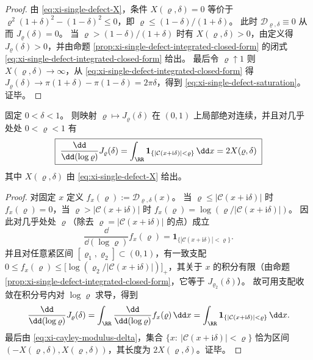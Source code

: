 \begin{proof}
由 \eqref{eq:xi-single-defect-X}，条件 \(X(\varrho,\delta)=0\) 等价于
\(
\varrho^2(1+\delta)^2-(1-\delta)^2\le 0
\)，即 \(\varrho\le (1-\delta)/(1+\delta)\)。
此时 \(\mathcal{D}_{\varrho,\delta}\equiv 0\) 从而 \(J_{\varrho}(\delta)=0\)。
当 \(\varrho>(1-\delta)/(1+\delta)\) 时有 \(X(\varrho,\delta)>0\)，由定义得 \(J_{\varrho}(\delta)>0\)，并由命题 \ref{prop:xi-single-defect-integrated-closed-form} 的闭式 \eqref{eq:xi-single-defect-integrated-closed-form} 给出。
最后令 \(\varrho\uparrow 1\) 则 \(X(\varrho,\delta)\to\infty\)，从 \eqref{eq:xi-single-defect-integrated-closed-form} 得
\(
J_{\varrho}(\delta)\to \pi(1+\delta)-\pi(1-\delta)=2\pi\delta
\)，得到 \eqref{eq:xi-single-defect-saturation}。证毕。
\end{proof}



\begin{proposition}[可见区长度与对数半径导数]\label{prop:xi-single-defect-mass-log-derivative}
固定 \(0<\delta<1\)。
则映射 \(\varrho\mapsto J_{\varrho}(\delta)\) 在 \((0,1)\) 上局部绝对连续，并且对几乎处处 \(0<\varrho<1\) 有
\begin{equation}\label{eq:xi-single-defect-log-derivative}
\boxed{\;
\frac{\dd}{\dd(\log\varrho)}J_{\varrho}(\delta)
=\int_{\RR}\mathbf 1_{\{|\mathcal{C}(x+\mathrm{i}\delta)|<\varrho\}}\,\dd x
=2X(\varrho,\delta)\;}
\end{equation}
其中 \(X(\varrho,\delta)\) 由 \eqref{eq:xi-single-defect-X} 给出。
\end{proposition}

\begin{proof}
对固定 \(x\) 定义
\(
f_x(\varrho):=\mathcal{D}_{\varrho,\delta}(x)
\)。
当 \(\varrho\le |\mathcal{C}(x+\mathrm{i}\delta)|\) 时 \(f_x(\varrho)=0\)，当 \(\varrho>|\mathcal{C}(x+\mathrm{i}\delta)|\) 时
\(
f_x(\varrho)=\log(\varrho/|\mathcal{C}(x+\mathrm{i}\delta)|)
\)。
因此对几乎处处 \(\varrho\)（除去 \(\varrho=|\mathcal{C}(x+\mathrm{i}\delta)|\) 的点）成立
\[
\frac{\dd}{\dd(\log\varrho)}f_x(\varrho)=\mathbf 1_{\{|\mathcal{C}(x+\mathrm{i}\delta)|<\varrho\}}.
\]
并且对任意紧区间 \([\varrho_1,\varrho_2]\subset(0,1)\)，有一致支配
\(
0\le f_x(\varrho)\le \bigl[\log(\varrho_2/|\mathcal{C}(x+\mathrm{i}\delta)|)\bigr]_+
\)，其关于 \(x\) 的积分有限（由命题 \ref{prop:xi-single-defect-integrated-closed-form}，它等于 \(J_{\varrho_2}(\delta)\)）。
故可用支配收敛在积分号内对 \(\log\varrho\) 求导，得到
\[
\frac{\dd}{\dd(\log\varrho)}J_{\varrho}(\delta)
=\int_{\RR}\frac{\dd}{\dd(\log\varrho)}f_x(\varrho)\,\dd x
=\int_{\RR}\mathbf 1_{\{|\mathcal{C}(x+\mathrm{i}\delta)|<\varrho\}}\,\dd x.
\]
最后由 \eqref{eq:xi-cayley-modulus-delta}，集合 \(\{x:\ |\mathcal{C}(x+\mathrm{i}\delta)|<\varrho\}\) 恰为区间 \((-X(\varrho,\delta),X(\varrho,\delta))\)，其长度为 \(2X(\varrho,\delta)\)。证毕。
\end{proof}

